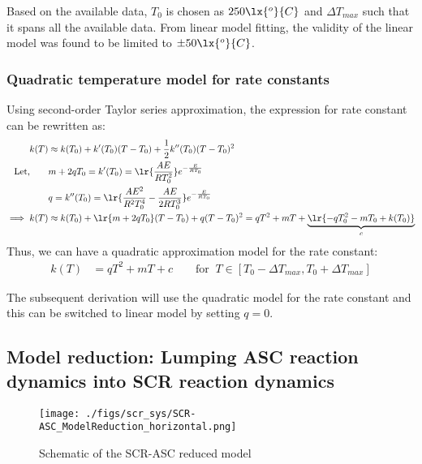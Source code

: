 Based on the available data, $T_0$ is chosen as $250 \lx{^o}{C}$ and $\Delta T_{max}$ such that it spans all the
available data. From linear model fitting, the validity of the linear model was found to be limited to $\pm 50
\lx{^o}{C}$.

\subsubsection{Quadratic temperature model for rate constants}
Using second-order Taylor series approximation, the expression for rate constant can be rewritten as:
\begin{align*}
    k(T) &\approx k(T_0) + k'(T_0) (T - T_0) + \frac{1}{2} k''(T_0) (T - T_0)^2\\
    \text{Let,} \qquad
    &m + 2qT_0 = k'(T_0) = \lr{\frac{AE}{RT_0^2}} e^{-\frac{E}{RT_0}} \\
    &q = k''(T_0) = \lr{\frac{A E^2}{R^2 T_0^4} - \frac{A E}{2 R T_0^3}} e^{-\frac{E}{RT_0}} \\
    \implies k(T) &\approx k(T_0) + \lr{m + 2qT_0} (T - T_0) + q (T - T_0)^2
                   = q T^2 + m T + \underbrace{\lr{ -  q T_0^2 - mT_0  + k(T_0)}}_c
\end{align*}
Thus, we can have a quadratic approximation model for the rate constant:
\begin{align}
    k(T) &= q T^2 + m T + c \qquad \text{for } \: T \in [T_0 - \Delta T_{max}, T_0 + \Delta T_{max}]
\end{align}

The subsequent derivation will use the quadratic model for the rate constant and this can be switched to linear model by setting $q = 0$.


\subsection{Model reduction: Lumping ASC reaction dynamics into SCR reaction dynamics}

\begin{figure}[H]
    \centering
    \texttt{[image: ./figs/scr\_sys/SCR-ASC\_ModelReduction\_horizontal.png]}
    \caption{Schematic of the SCR-ASC reduced model}
    \label{fig:scr-asc}
\end{figure}
